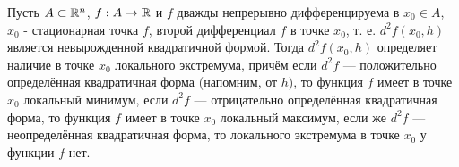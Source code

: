 \begin{teorema}
Пусть $A\subset\mathbb{R}^n$, $f:A \to \mathbb{R}$ и $f$ дважды непрерывно дифференцируема в $x_0\in A$, $x_0$ - стационарная точка $f$,
второй дифференциал $f$ в точке $x_0$, т. е. $d^2 f(x_0,h)$ является невырожденной квадратичной формой.
Тогда $d^2 f(x_0,h)$ определяет наличие в точке $x_0$ локального экстремума, причём если $d^2 f$ --- положительно определённая квадратичная форма (напомним, от $h$), то функция $f$ имеет в точке $x_0$ локальный минимум, если $d^2 f$ --- отрицательно определённая квадратичная форма, то функция $f$ имеет в точке $x_0$ локальный максимум, если же $d^2 f$ --- неопределённая квадратичная форма, то локального экстремума в точке $x_0$ у функции $f$ нет.
\end{teorema}
\dokvo


\dokno
